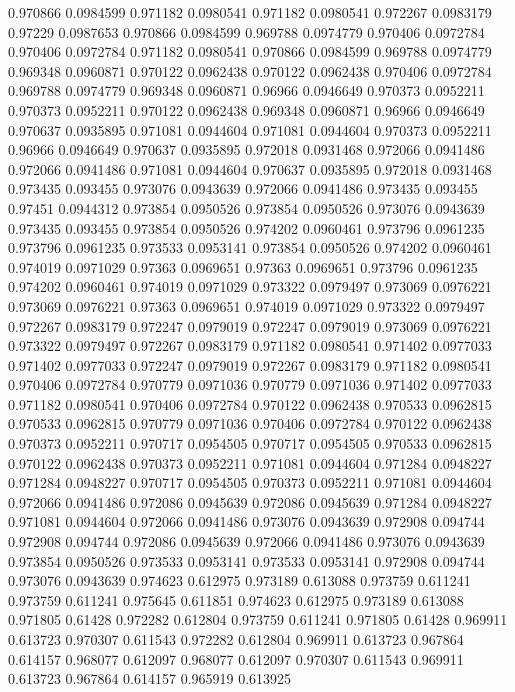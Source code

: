 0.970866 0.0984599
0.971182 0.0980541
0.971182 0.0980541
0.972267 0.0983179
0.97229 0.0987653
0.970866 0.0984599
0.969788 0.0974779
0.970406 0.0972784
0.970406 0.0972784
0.971182 0.0980541
0.970866 0.0984599
0.969788 0.0974779
0.969348 0.0960871
0.970122 0.0962438
0.970122 0.0962438
0.970406 0.0972784
0.969788 0.0974779
0.969348 0.0960871
0.96966 0.0946649
0.970373 0.0952211
0.970373 0.0952211
0.970122 0.0962438
0.969348 0.0960871
0.96966 0.0946649
0.970637 0.0935895
0.971081 0.0944604
0.971081 0.0944604
0.970373 0.0952211
0.96966 0.0946649
0.970637 0.0935895
0.972018 0.0931468
0.972066 0.0941486
0.972066 0.0941486
0.971081 0.0944604
0.970637 0.0935895
0.972018 0.0931468
0.973435 0.093455
0.973076 0.0943639
0.972066 0.0941486
0.973435 0.093455
0.97451 0.0944312
0.973854 0.0950526
0.973854 0.0950526
0.973076 0.0943639
0.973435 0.093455
0.973854 0.0950526
0.974202 0.0960461
0.973796 0.0961235
0.973796 0.0961235
0.973533 0.0953141
0.973854 0.0950526
0.974202 0.0960461
0.974019 0.0971029
0.97363 0.0969651
0.97363 0.0969651
0.973796 0.0961235
0.974202 0.0960461
0.974019 0.0971029
0.973322 0.0979497
0.973069 0.0976221
0.973069 0.0976221
0.97363 0.0969651
0.974019 0.0971029
0.973322 0.0979497
0.972267 0.0983179
0.972247 0.0979019
0.972247 0.0979019
0.973069 0.0976221
0.973322 0.0979497
0.972267 0.0983179
0.971182 0.0980541
0.971402 0.0977033
0.971402 0.0977033
0.972247 0.0979019
0.972267 0.0983179
0.971182 0.0980541
0.970406 0.0972784
0.970779 0.0971036
0.970779 0.0971036
0.971402 0.0977033
0.971182 0.0980541
0.970406 0.0972784
0.970122 0.0962438
0.970533 0.0962815
0.970533 0.0962815
0.970779 0.0971036
0.970406 0.0972784
0.970122 0.0962438
0.970373 0.0952211
0.970717 0.0954505
0.970717 0.0954505
0.970533 0.0962815
0.970122 0.0962438
0.970373 0.0952211
0.971081 0.0944604
0.971284 0.0948227
0.971284 0.0948227
0.970717 0.0954505
0.970373 0.0952211
0.971081 0.0944604
0.972066 0.0941486
0.972086 0.0945639
0.972086 0.0945639
0.971284 0.0948227
0.971081 0.0944604
0.972066 0.0941486
0.973076 0.0943639
0.972908 0.094744
0.972908 0.094744
0.972086 0.0945639
0.972066 0.0941486
0.973076 0.0943639
0.973854 0.0950526
0.973533 0.0953141
0.973533 0.0953141
0.972908 0.094744
0.973076 0.0943639
0.974623 0.612975
0.973189 0.613088
0.973759 0.611241
0.973759 0.611241
0.975645 0.611851
0.974623 0.612975
0.973189 0.613088
0.971805 0.61428
0.972282 0.612804
0.973759 0.611241
0.971805 0.61428
0.969911 0.613723
0.970307 0.611543
0.972282 0.612804
0.969911 0.613723
0.967864 0.614157
0.968077 0.612097
0.968077 0.612097
0.970307 0.611543
0.969911 0.613723
0.967864 0.614157
0.965919 0.613925
